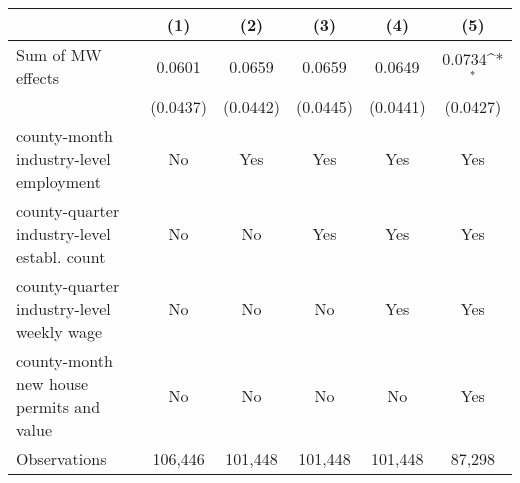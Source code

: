 {
\def\sym#1{\ifmmode^{#1}\else\(^{#1}\)\fi}
\begin{tabular}{l*{5}{c}}
\hline\hline
          &\multicolumn{1}{c}{(1)}         &\multicolumn{1}{c}{(2)}         &\multicolumn{1}{c}{(3)}         &\multicolumn{1}{c}{(4)}         &\multicolumn{1}{c}{(5)}         \\
\hline
Sum of MW effects&   0.0601         &   0.0659         &   0.0659         &   0.0649         &   0.0734\sym{*}  \\
          & (0.0437)         & (0.0442)         & (0.0445)         & (0.0441)         & (0.0427)         \\
\hline
county-month industry-level employment&       No         &      Yes         &      Yes         &      Yes         &      Yes         \\
county-quarter industry-level establ. count&       No         &       No         &      Yes         &      Yes         &      Yes         \\
county-quarter industry-level weekly wage&       No         &       No         &       No         &      Yes         &      Yes         \\
county-month new house permits and value&       No         &       No         &       No         &       No         &      Yes         \\
Observations&  106,446         &  101,448         &  101,448         &  101,448         &   87,298         \\
\hline\hline
\end{tabular}
}
